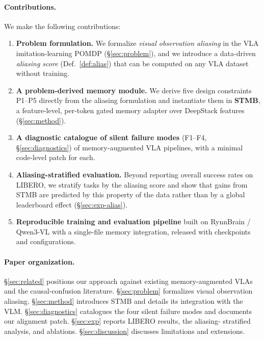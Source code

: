 \documentclass[11pt]{article}
\begin{document}
\paragraph{Contributions.} We make the following contributions:
\begin{enumerate}
    \item \textbf{Problem formulation.} We formalize \emph{visual observation
    aliasing} in the VLA imitation-learning POMDP
    (\S\ref{sec:problem}), and we introduce a data-driven \emph{aliasing score}
    (Def.~\ref{def:alias}) that can be computed on any VLA dataset without
    training.
    \item \textbf{A problem-derived memory module.} We derive five design
    constraints P1--P5 directly from the aliasing formulation and instantiate
    them in \textbf{STMB}, a feature-level, per-token gated memory adapter over
    DeepStack features (\S\ref{sec:method}).
    \item \textbf{A diagnostic catalogue of silent failure modes} (F1--F4,
    \S\ref{sec:diagnostics}) of memory-augmented VLA pipelines, with a minimal
    code-level patch for each.
    \item \textbf{Aliasing-stratified evaluation.} Beyond reporting overall
    success rates on LIBERO, we stratify tasks by the aliasing score and show
    that gains from STMB are predicted by this property of the data rather
    than by a global leaderboard effect (\S\ref{sec:exp-alias}).
    \item \textbf{Reproducible training and evaluation pipeline} built on
    RynnBrain / Qwen3-VL with a single-file memory integration, released with
    checkpoints and configurations.
\end{enumerate}

\paragraph{Paper organization.} \S\ref{sec:related} positions our approach
against existing memory-augmented VLAs and the causal-confusion literature.
\S\ref{sec:problem} formalizes visual observation aliasing. \S\ref{sec:method}
introduces STMB and details its integration with the VLM.
\S\ref{sec:diagnostics} catalogues the four silent failure modes and documents
our alignment patch. \S\ref{sec:exp} reports LIBERO results, the aliasing-
stratified analysis, and ablations. \S\ref{sec:discussion} discusses limitations
and extensions.

\end{document}
